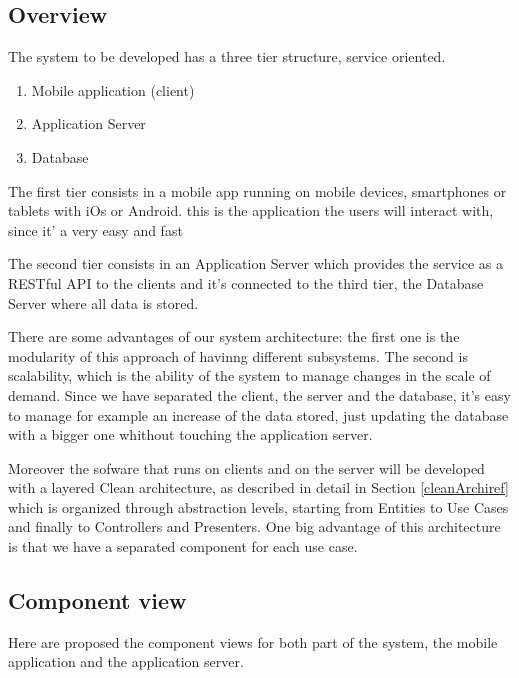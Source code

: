 \subsection{Overview}
The system to be developed has a three tier structure, service oriented.
\begin{enumerate}
  \item Mobile application (client)
  \item Application Server
  \item Database
\end{enumerate}

The first tier consists in a mobile app running on mobile devices, smartphones or tablets with iOs or Android.
this is the application the users will interact with, since it' a very easy and fast

The second tier consists in an Application Server which provides the service as a RESTful API to the clients and it's connected to the third tier, the Database Server where all data is stored.

There are some advantages of our system architecture: the first one is the modularity of this approach of havinng different subsystems. The second is scalability,  which is the ability of the system to manage changes in the scale of demand. Since we have separated the client, the server and the database, it's easy to manage for example an increase of the data stored, just updating the database with a bigger one whithout touching the application server.

Moreover the sofware that runs on clients and on the server will be developed with a layered Clean architecture, as described in detail in Section \ref{cleanArchiref} which is organized through abstraction levels, starting from Entities to Use Cases and finally to Controllers and Presenters.
One big advantage of this architecture is that we have a separated component for each use case.

\subsection{Component view}
Here are proposed the component views for both part of the system, the mobile application and the application server.

